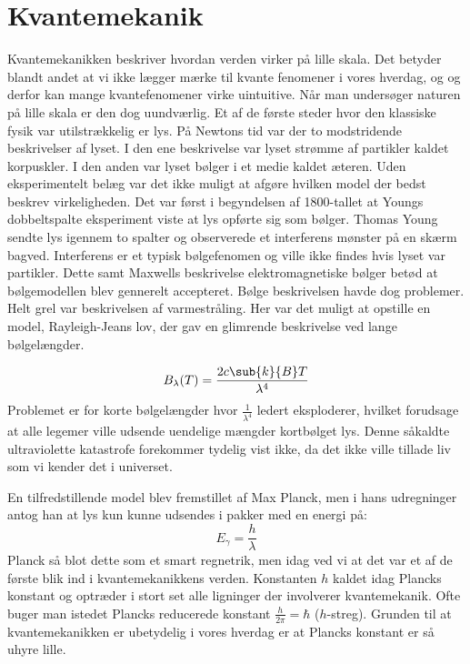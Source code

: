 \chapter{Kvantemekanik}


Kvantemekanikken beskriver hvordan verden virker på lille skala.
Det betyder blandt andet at vi ikke lægger mærke til kvante fenomener i vores hverdag, og og derfor kan mange kvantefenomener virke uintuitive.
Når man undersøger naturen på lille skala er den dog uundværlig.
Et af de første steder hvor den klassiske fysik var utilstrækkelig er lys.
På Newtons tid var der to modstridende beskrivelser af lyset.
I den ene beskrivelse var lyset strømme af partikler kaldet korpuskler.
I den anden var lyset bølger i et medie kaldet æteren.
Uden eksperimentelt belæg var det ikke muligt at afgøre hvilken model der bedst beskrev virkeligheden.
Det var først i begyndelsen af 1800-tallet at Youngs dobbeltspalte eksperiment viste at lys opførte sig som bølger.
Thomas Young sendte lys igennem to spalter og observerede et interferens mønster på en skærm bagved.
Interferens er et typisk bølgefenomen og ville ikke findes hvis lyset var partikler.
Dette samt Maxwells beskrivelse elektromagnetiske bølger betød at bølgemodellen blev gennerelt accepteret.
Bølge beskrivelsen havde dog problemer.
Helt grel var beskrivelsen af varmestråling.
Her var det muligt at opstille en model, Rayleigh-Jeans lov, der gav en glimrende beskrivelse ved lange bølgelængder.

$$
B_\lambda (T)= \frac{2c\sub{k}{B}T}{\lambda^4}
$$
Problemet er for korte bølgelængder hvor $\frac{1}{\lambda^4}$ ledert eksploderer, hvilket forudsage at alle legemer ville udsende uendelige mængder kortbølget lys. Denne såkaldte ultraviolette katastrofe forekommer tydelig vist ikke, da det ikke ville tillade liv som vi kender det i universet.

En tilfredstillende model blev fremstillet af Max Planck, men i hans udregninger antog han at lys kun kunne udsendes i pakker med en energi på:
\begin{equation}
E_\gamma = \frac{h}{\lambda}
\end{equation}
Planck så blot dette som et smart regnetrik, men idag ved vi at det var et af de første blik ind i kvantemekanikkens verden. Konstanten $h$ kaldet idag Plancks konstant og optræder i stort set alle ligninger der involverer kvantemekanik. Ofte buger man istedet Plancks reducerede konstant $\frac{h}{2\pi}=\hbar$ ($h$-streg).
Grunden til at kvantemekanikken er ubetydelig i vores hverdag er at Plancks konstant er så uhyre lille. 

